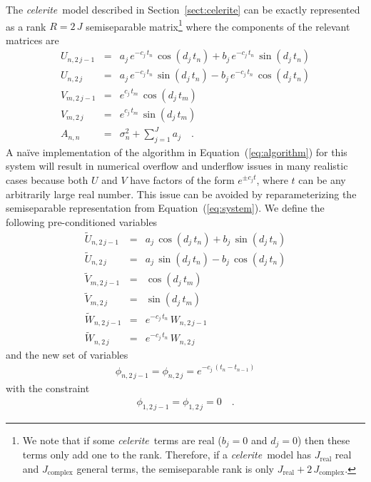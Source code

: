 \documentclass[manuscript, letterpaper]{aastex6}
\newcommand{\celeriteterm}{\emph{celerite}}
\renewcommand{\eqref}[1]{\ref{eq:#1}}
\newcommand{\Eq}[1]{Equation~(\eqref{#1})}
\newcommand{\eq}[1]{\Eq{#1}}
\newcommand{\eqlabel}[1]{\label{eq:#1}}
\newcommand{\sectionname}{Section}
\newcommand{\sectref}[1]{\ref{sect:#1}}
\newcommand{\Sect}[1]{\sectionname~\sectref{#1}}
\newcommand{\sect}[1]{\Sect{#1}}
\begin{document}
The \celeriteterm\ model described in \sect{celerite} can be exactly
represented as a rank $R = 2\,J$ semiseparable matrix\footnote{We note that if
some \celeriteterm\ terms are real ($b_j=0$ and $d_j=0$) then these terms only
add one to the rank.
Therefore, if a \celeriteterm\ model has $J_\mathrm{real}$ real and
$J_\mathrm{complex}$ general terms, the semiseparable rank is only
$J_\mathrm{real} + 2\,J_\mathrm{complex}$.}
where the components of the relevant matrices are
\begin{eqnarray}\eqlabel{system}
U_{n,2\,j-1} &=& a_j\,e^{-c_j\,t_n}\,\cos(d_j\,t_n) +
    b_j\,e^{-c_j\,t_n}\,\sin(d_j\,t_n) \nonumber\\
U_{n,2\,j} &=& a_j\,e^{-c_j\,t_n}\,\sin(d_j\,t_n) -
    b_j\,e^{-c_j\,t_n}\,\cos(d_j\,t_n) \nonumber\\
V_{m,2\,j-1} &=& e^{c_j\,t_m}\,\cos(d_j\,t_m) \nonumber\\
V_{m,2\,j} &=& e^{c_j\,t_m}\,\sin(d_j\,t_m) \nonumber\\
A_{n,n} &=& \sigma_n^2 + \sum_{j=1}^J a_j \quad.
\end{eqnarray}
A na\"ive implementation of the algorithm in \eq{algorithm} for this system
will result in numerical overflow and underflow issues in many realistic cases
because both $U$ and $V$ have factors of the form $e^{\pm c_j t}$, where $t$
can be any arbitrarily large real number.
This issue can be avoided by reparameterizing the semiseparable representation
from \eq{system}.
We define the following pre-conditioned variables
\begin{eqnarray}\eqlabel{reparam}
\tilde{U}_{n,2\,j-1} &=& a_j\,\cos(d_j\,t_n) + b_j\,\sin(d_j\,t_n) \nonumber\\
\tilde{U}_{n,2\,j} &=& a_j\,\sin(d_j\,t_n) - b_j\,\cos(d_j\,t_n) \nonumber\\
\tilde{V}_{m,2\,j-1} &=& \cos(d_j\,t_m) \nonumber\\
\tilde{V}_{m,2\,j} &=& \sin(d_j\,t_m) \nonumber\\
\tilde{W}_{n,2\,j-1} &=& e^{-c_j\,t_n}\,W_{n,2\,j-1} \nonumber\\
\tilde{W}_{n,2\,j} &=& e^{-c_j\,t_n}\,W_{n,2\,j}
\end{eqnarray}
and the new set of variables
\begin{eqnarray}
\phi_{n,2\,j-1} = \phi_{n,2\,j} = e^{-c_j\,(t_n - t_{n-1})}
\end{eqnarray}
with the constraint
\begin{eqnarray}
\phi_{1,2\,j-1} = \phi_{1,2\,j} = 0 \quad.
\end{eqnarray}
\end{document}
